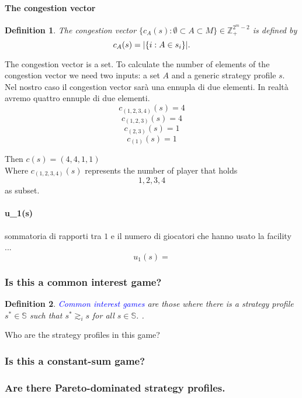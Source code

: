 \documentclass{article}
\newtheorem{defn}{Definition}
\begin{document}
\paragraph{The congestion vector}
\begin{defn}
	The congestion vector $\{c_A(s):\emptyset\subset A\subset M\}\in\mathbb Z_+^{2^m-2}$ is defined by $$c_A(s)=|\{i:A\in s_i\}|\text .$$
\end{defn}
The congestion vector is a set. To calculate the number of elements of the congestion vector we need two inputs: a set $A$ and a generic strategy profile $s$. \\

Nel nostro caso il congestion vector sar\`a una ennupla di due elementi. In realt\`a avremo quattro ennuple di due elementi.
\[ c_{(1,2,3,4)} (s) = 4 \]
\[ c_{(1,2,3)}   (s) = 4 \]
\[ c_{(2,3)}     (s) = 1 \]
\[ c_{(1)}       (s) = 1 \]

Then $c(s) = (4,4,1,1)$ \\

Where $c_{(1,2,3,4)}(s)$ represents the number of player that holds $$ 1,2,3,4 $$ as subset.

\paragraph{u_1(s)}
sommatoria di rapporti tra $1$ e il numero di giocatori che hanno usato la facility ...
\[
	u_1(s) = 
\]
 

\subsubsection{Is this a common interest game?}
\begin{defn}
	\textcolor{blue}{Common interest games} are those where there is a strategy profile $s^* \in \mathbb{S}$ such that $s^* \gtrsim_i s$ for all $s \in \mathbb{S}$. \cite{rossi01}.
\end{defn}

Who are the strategy profiles in this game?

\subsubsection{Is this a constant-sum game?}

\subsubsection{Are there Pareto-dominated strategy profiles.}
\end{document}
